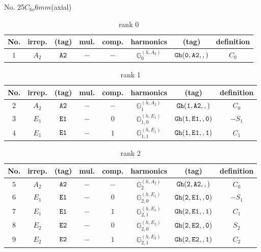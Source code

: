 \documentclass[fleqn,8pt]{jsarticle}
\begin{document}
\setcounter{MaxMatrixCols}{16}

\begin{center}
\LARGE
No. 25\quad$C_{6v}$\quad$6mm$\quad[ hexagonal ] (axial)
\end{center}
\begin{table}[ht!]
\begin{center}
\caption{rank 0}
\renewcommand{\arraystretch}{1.3}
\begin{tabular}{cccccccc} \hline \hline
No. & irrep. & (tag) & mul. & comp. & harmonics & (tag) & definition \\ \hline
$ 1 $ & $ A_{2} $ & $ {\tt A2} $ & $ - $ & $ - $ & $ \mathbb{G}_{0}^{(h,A_{2})} $ & $ {\tt Gh(0,A2,,)} $ & $ C_{0} $ \\
 \hline \hline
\end{tabular}
\end{center}
\end{table}
\begin{table}[ht!]
\begin{center}
\caption{rank 1}
\renewcommand{\arraystretch}{1.3}
\begin{tabular}{cccccccc} \hline \hline
No. & irrep. & (tag) & mul. & comp. & harmonics & (tag) & definition \\ \hline
$ 2 $ & $ A_{2} $ & $ {\tt A2} $ & $ - $ & $ - $ & $ \mathbb{G}_{1}^{(h,A_{2})} $ & $ {\tt Gh(1,A2,,)} $ & $ C_{0} $ \\
$ 3 $ & $ E_{1} $ & $ {\tt E1} $ & $ - $ & $ 0 $ & $ \mathbb{G}_{1,0}^{(h,E_{1})} $ & $ {\tt Gh(1,E1,,0)} $ & $ - S_{1} $ \\
$ 4 $ & $ E_{1} $ & $ {\tt E1} $ & $ - $ & $ 1 $ & $ \mathbb{G}_{1,1}^{(h,E_{1})} $ & $ {\tt Gh(1,E1,,1)} $ & $ C_{1} $ \\
 \hline \hline
\end{tabular}
\end{center}
\end{table}
\begin{table}[ht!]
\begin{center}
\caption{rank 2}
\renewcommand{\arraystretch}{1.3}
\begin{tabular}{cccccccc} \hline \hline
No. & irrep. & (tag) & mul. & comp. & harmonics & (tag) & definition \\ \hline
$ 5 $ & $ A_{2} $ & $ {\tt A2} $ & $ - $ & $ - $ & $ \mathbb{G}_{2}^{(h,A_{2})} $ & $ {\tt Gh(2,A2,,)} $ & $ C_{0} $ \\
$ 6 $ & $ E_{1} $ & $ {\tt E1} $ & $ - $ & $ 0 $ & $ \mathbb{G}_{2,0}^{(h,E_{1})} $ & $ {\tt Gh(2,E1,,0)} $ & $ - S_{1} $ \\
$ 7 $ & $ E_{1} $ & $ {\tt E1} $ & $ - $ & $ 1 $ & $ \mathbb{G}_{2,1}^{(h,E_{1})} $ & $ {\tt Gh(2,E1,,1)} $ & $ C_{1} $ \\
$ 8 $ & $ E_{2} $ & $ {\tt E2} $ & $ - $ & $ 0 $ & $ \mathbb{G}_{2,0}^{(h,E_{2})} $ & $ {\tt Gh(2,E2,,0)} $ & $ S_{2} $ \\
$ 9 $ & $ E_{2} $ & $ {\tt E2} $ & $ - $ & $ 1 $ & $ \mathbb{G}_{2,1}^{(h,E_{2})} $ & $ {\tt Gh(2,E2,,1)} $ & $ C_{2} $ \\
 \hline \hline
\end{tabular}
\end{center}
\end{table}
\end{document}
